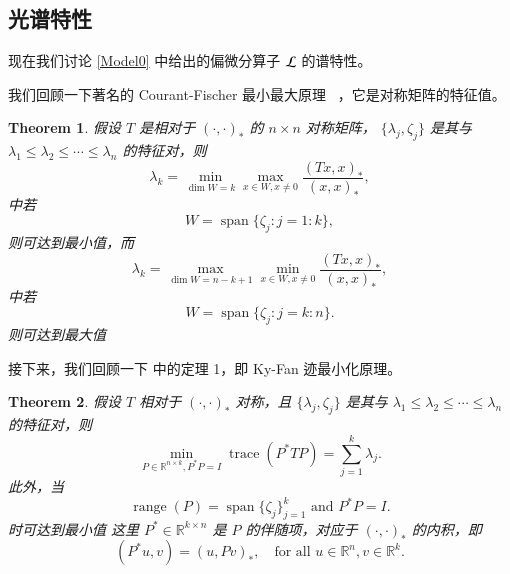 \documentclass[12pt]{acta_2011xz}
\newtheorem{theorem}{Theorem}[section]
\begin{document}
 
 
 
   

   \subsection{光谱特性  }       \label{s:algebraic-spectral}    现在我们讨论    \eqref{Model0}    中给出的偏微分算子    ${\cal L}$    的谱特性。  

我们回顾一下著名的 Courant-Fischer 最小最大原理~    \cite{courant1924methoden}   ，它是对称矩阵的特征值。
   \begin{theorem}   \label{thm:minmax}    假设    $T$    是相对于    $(\cdot, \cdot)_*$    的    $n\times n$    对称矩阵，   $ \{ \lambda_j, \zeta_j \} $    是其与    $\lambda_1\le \lambda_2\le \cdots \le \lambda_n$    的特征对，则 
   \begin{equation}\label{minmax}
        \lambda_k=\min_{\dim W=k}\max_{x\in W, x\ne 0}\frac{(Tx, x)_*}{(x, x)_*},
    \end{equation}    中若 
   \begin{equation}\label{minmax-opt}
        W=\operatorname{span} \{ \zeta_j: j=1:k \} ,
    \end{equation}    则可达到最小值，而 
   \begin{equation}\label{maxmin}
        \lambda_k=\max_{\dim W=n-k+1}\min_{x\in W, x\ne 0}\frac{(Tx, x)_*}{(x, x)_*},
    \end{equation}    中若 
   \begin{equation}\label{maxmin-opt}
        W=\operatorname{span} \{ \zeta_j: j=k:n \} .
    \end{equation}    则可达到最大值  \end{theorem}    接下来，我们回顾一下    \cite{fan1949theorem}    中的定理 1，即 Ky-Fan 迹最小化原理。
   \begin{theorem}   \label{thm:fan}    假设    $T$    相对于    $(\cdot, \cdot)_*$    对称，且
   $ \{ \lambda_j, \zeta_j \} $    是其与
   $\lambda_1\le \lambda_2\le \cdots \le \lambda_n$    的特征对，则
   \begin{equation*}
        \min_{P\in \mathbb{R}^{n\times k}, P^*P=I}\operatorname{trace}(P^*TP) = \sum_{j=1}^{k}\lambda_j.
    \end{equation*}    此外，当 
   \begin{equation*}
    \operatorname{range}(P)=\operatorname{span} \{ \zeta_j \} _{j=1}^{k} \text{ and } P^*P=I. 
\end{equation*}    时可达到最小值 这里    $P^*\in \mathbb{R}^{k\times n}$    是    $P$    的伴随项，对应于    $(\cdot, \cdot)_*$    的内积，即
   \begin{equation*}
        (P^* u, v)= (u, Pv)_*, \quad \text{for all } u\in \mathbb{R}^{n}, v\in \mathbb{R}^{k}.
    \end{equation*}     \end{theorem}     
\end{document}
